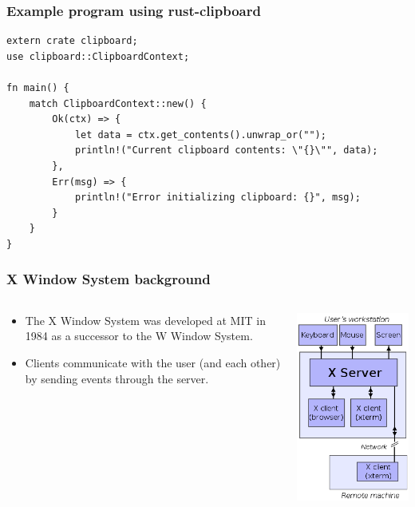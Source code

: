 \documentclass{beamer}
\begin{document}
\begin{frame}[fragile]
\frametitle{Example program using rust-clipboard}
\begin{Verbatim}[frame=single, fontsize=\scriptsize]
extern crate clipboard;
use clipboard::ClipboardContext;

fn main() {
    match ClipboardContext::new() {
        Ok(ctx) => {
            let data = ctx.get_contents().unwrap_or("");
            println!("Current clipboard contents: \"{}\"", data);
        },
        Err(msg) => {
            println!("Error initializing clipboard: {}", msg);
        }
    }
}
\end{Verbatim}
\end{frame}

\begin{frame}[fragile]
\frametitle{X Window System background}
\begin{columns}
\begin{column}{0.5\textwidth}
\begin{itemize}
\item
The X Window System was developed at MIT in 1984 as a successor to the W Window System.
\item
Clients communicate with the user (and each other) by sending events through the server.
\end{itemize}
\end{column}
\begin{column}{0.5\textwidth}
\includegraphics[height=0.8\textheight]{X_client_server_example.png}
\end{column}
\end{columns}
\end{frame}
\end{document}
